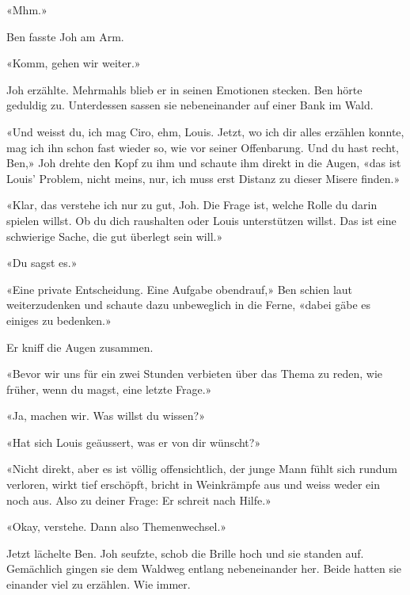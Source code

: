 «Mhm.»

Ben fasste Joh am Arm.

«Komm, gehen wir weiter.»

Joh erzählte. Mehrmahls blieb er in seinen Emotionen stecken. Ben hörte geduldig zu.
Unterdessen sassen sie nebeneinander auf einer Bank im Wald.

«Und weisst du, ich mag Ciro, ehm, Louis. Jetzt, wo ich dir alles
erzählen konnte, mag ich ihn schon fast wieder so, wie vor seiner
Offenbarung. Und du hast recht, Ben,» Joh drehte den Kopf zu ihm und
schaute ihm direkt in die Augen, «das ist Louis’ Problem, nicht meins,
nur, ich muss erst Distanz zu dieser Misere finden.»

«Klar, das verstehe ich nur zu gut, Joh. Die Frage ist, welche Rolle du
darin spielen willst. Ob du dich raushalten oder Louis unterstützen
willst. Das ist eine schwierige Sache, die gut überlegt sein will.»

«Du sagst es.»

«Eine private Entscheidung. Eine Aufgabe obendrauf,» Ben schien laut
weiterzudenken und schaute dazu unbeweglich in die Ferne, «dabei gäbe es
einiges zu bedenken.»

Er kniff die Augen zusammen.

«Bevor wir uns für ein zwei Stunden verbieten über das Thema zu reden,
wie früher, wenn du magst, eine letzte Frage.»

«Ja, machen wir. Was willst du wissen?»

«Hat sich Louis geäussert, was er von dir wünscht?»

«Nicht direkt, aber es ist völlig offensichtlich, der junge Mann fühlt
sich rundum verloren, wirkt tief erschöpft, bricht in Weinkrämpfe aus
und weiss weder ein noch aus. Also zu deiner Frage: Er schreit nach
Hilfe.»

«Okay, verstehe. Dann also Themenwechsel.»

Jetzt lächelte Ben. Joh seufzte, schob die Brille hoch und sie standen
auf. Gemächlich gingen sie dem Waldweg entlang nebeneinander her. Beide
hatten sie einander viel zu erzählen. Wie immer.
